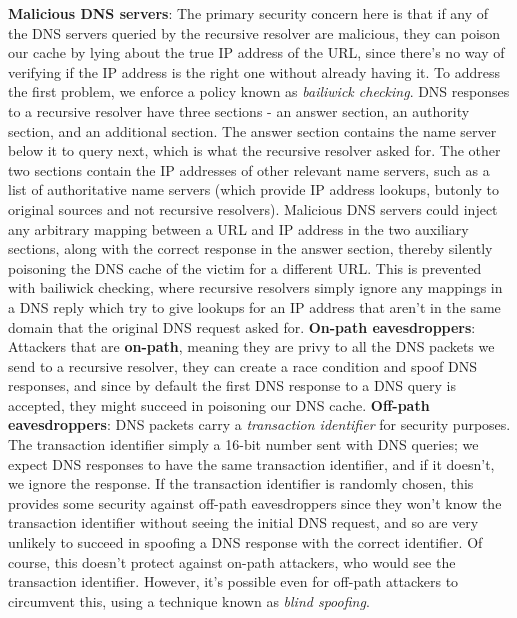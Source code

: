 \documentclass{article}
\begin{document}
\newline \newline
\textbf{Malicious DNS servers}: The primary security concern here is that if any of the DNS servers queried by the recursive resolver are malicious, they can poison our cache by lying about the true IP address of the URL, since there's no way of verifying if the IP address is the right one without already having it. To address the first problem, we enforce a policy known as \textit{bailiwick checking}. DNS responses to a recursive resolver have three sections - an answer section, an authority section, and an additional section. The answer section contains the name server below it to query next, which is what the recursive resolver asked for. The other two sections contain the IP addresses of other relevant name servers, such as a list of authoritative name servers (which provide IP address lookups, butonly to original sources and not recursive resolvers). Malicious DNS servers could inject any arbitrary mapping between a URL and IP address in the two auxiliary sections, along with the correct response in the answer section, thereby silently poisoning the DNS cache of the victim for a different URL. This is prevented with bailiwick checking, where recursive resolvers simply ignore any mappings in a DNS reply which try to give lookups for an IP address that aren't in the same domain that the original DNS request asked for.
\newline \newline
\textbf{On-path eavesdroppers}: Attackers that are \textbf{on-path}, meaning they are privy to all the DNS packets we send to a recursive resolver, they can create a race condition and spoof DNS responses, and since by default the first DNS response to a DNS query is accepted, they might succeed in poisoning our DNS cache.  
\newline \newline
\textbf{Off-path eavesdroppers}: DNS packets carry a \textit{transaction identifier} for security purposes. The transaction identifier simply a 16-bit number sent with DNS queries; we expect DNS responses to have the same transaction identifier, and if it doesn't, we ignore the response. If the transaction identifier is randomly chosen, this provides some security against off-path eavesdroppers since they won't know the transaction identifier without seeing the initial DNS request, and so are very unlikely to succeed in spoofing a DNS response with the correct identifier. Of course, this doesn't protect against on-path attackers, who would see the transaction identifier. However, it's possible even for off-path attackers to circumvent this, using a technique known as \textit{blind spoofing}.
\end{document}

